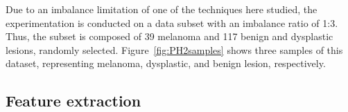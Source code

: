Due to an imbalance limitation of one of the techniques here studied, the experimentation is conducted on a data subset with an imbalance ratio of 1:3.
Thus, the subset is composed of 39 melanoma and 117 benign and dysplastic lesions, randomly selected. 
Figure~\ref{fig:PH2samples} shows three samples of this dataset, representing melanoma, dysplastic, and benign lesion, respectively. 



\subsection{Feature extraction}\label{sec:feat}

